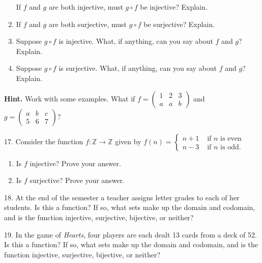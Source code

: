 \documentclass[10pt,]{book}
\theoremstyle{plain}
\theoremstyle{definition}
\theoremstyle{definition}
\numberwithin{equation}{chapter}
\newcommand{\Z}{\mathbb Z}
\newcommand{\twoline}[2]{\begin{pmatrix}#1 \\ #2 \end{pmatrix}}
\newcommand{\amp}{&}
\begin{document}
\begin{exerciselist}
\begin{enumerate}[label=(\alph*)]
If \(f\) and \(g\) are both injective, must \(g\circ f\) be injective?  Explain.%
\item\hypertarget{li-522}{}\hypertarget{p-785}{}%
If \(f\) and \(g\) are both surjective, must \(g\circ f\) be surjective?  Explain.%
\item\hypertarget{li-523}{}\hypertarget{p-786}{}%
Suppose \(g\circ f\) is injective.  What, if anything, can you say about \(f\) and \(g\)?  Explain.%
\item\hypertarget{li-524}{}\hypertarget{p-787}{}%
Suppose \(g\circ f\) is surjective.  What, if anything, can you say about \(f\) and \(g\)?  Explain.%
\end{enumerate}
%
\par\smallskip
\par\smallskip%
\noindent\textbf{Hint.}\hypertarget{hint-4}{}\quad%
\hypertarget{p-788}{}%
Work with some examples.  What if \(f = \twoline{1\amp 2 \amp 3}{a \amp a \amp b}\) and \(g = \twoline{a\amp b \amp c}{5 \amp 6 \amp 7}\)?%
\item[17.]\hypertarget{exercise-63}{}\hypertarget{p-794}{}%
Consider the function \(f:\Z \to \Z\) given by \(f(n) = \begin{cases}n+1 \amp  \text{ if }n\text{ is even} \\ n-3 \amp \text{ if }n\text{ is odd} . \end{cases}\) \leavevmode%
\begin{enumerate}[label=(\alph*)]
\item\hypertarget{li-529}{}\hypertarget{p-795}{}%
Is \(f\) injective? Prove your answer.%
\item\hypertarget{li-530}{}\hypertarget{p-796}{}%
Is \(f\) surjective? Prove your answer.%
\end{enumerate}
%
\par\smallskip
\item[18.]\hypertarget{exercise-64}{}\hypertarget{p-802}{}%
At the end of the semester a teacher assigns letter grades to each of her students. Is this a function? If so, what sets make up the domain and codomain, and is the function injective, surjective, bijective, or neither?%
\par\smallskip
\item[19.]\hypertarget{exercise-65}{}\hypertarget{p-804}{}%
In the game of \emph{Hearts}, four players are each dealt 13 cards from a deck of 52. Is this a function? If so, what sets make up the domain and codomain, and is the function injective, surjective, bijective, or neither?%
\par\smallskip

\end{exerciselist}
\end{document}
